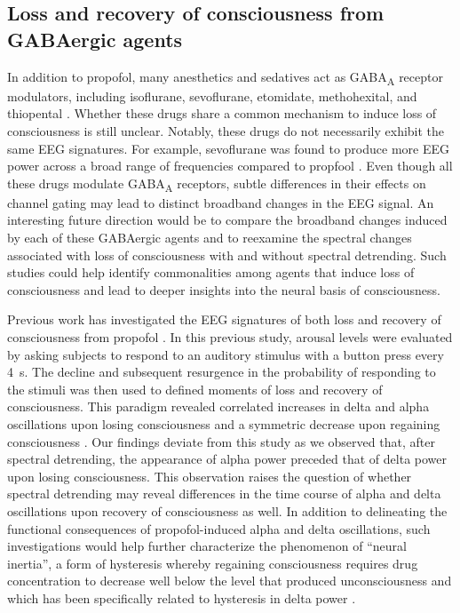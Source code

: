 \subsection{Loss and recovery of consciousness from GABAergic agents}
In addition to propofol, many anesthetics and sedatives act as GABA\textsubscript{A} receptor modulators, including isoflurane, sevoflurane, etomidate, methohexital, and thiopental \cite{Brohan2017}. Whether these drugs share a common mechanism to induce loss of consciousness is still unclear. Notably, these drugs do not necessarily exhibit the same EEG signatures. For example, sevoflurane was found to produce more EEG power across a broad range of frequencies compared to propfool \cite{Akeju2014}. Even though all these drugs modulate GABA\textsubscript{A} receptors, subtle differences in their effects on channel gating may lead to distinct broadband changes in the EEG signal. An interesting future direction would be to compare the broadband changes induced by each of these GABAergic agents and to reexamine the spectral changes associated with loss of consciousness with and without spectral detrending. Such studies could help identify commonalities among agents that induce loss of consciousness and lead to deeper insights into the neural basis of consciousness.

Previous work has investigated the EEG signatures of both loss and recovery of consciousness from propofol \cite{Purdon2013}. In this previous study, arousal levels were evaluated by asking subjects to respond to an auditory stimulus with a button press every \qty{4}{\second}. The decline and subsequent resurgence in the probability of responding to the stimuli was then used to defined moments of loss and recovery of consciousness. This paradigm revealed correlated increases in delta and alpha oscillations upon losing consciousness and a symmetric decrease upon regaining consciousness  \cite{Purdon2013}. Our findings deviate from this study as we observed that, after spectral detrending, the appearance of alpha power preceded that of delta power upon losing consciousness. This observation raises the question of whether spectral detrending may reveal differences in the time course of alpha and delta oscillations upon recovery of consciousness as well. In addition to delineating the functional consequences of propofol-induced alpha and delta oscillations, such investigations would help further characterize the phenomenon of ``neural inertia'', a form of hysteresis whereby regaining consciousness requires drug concentration to decrease well below the level that produced unconsciousness \cite{Kim2018, Warnaby2017, Voss2012, Joiner2013, Friedman2010, Steyn-Ross2004} and which has been specifically related to hysteresis in delta power \cite{Warnaby2017}.

